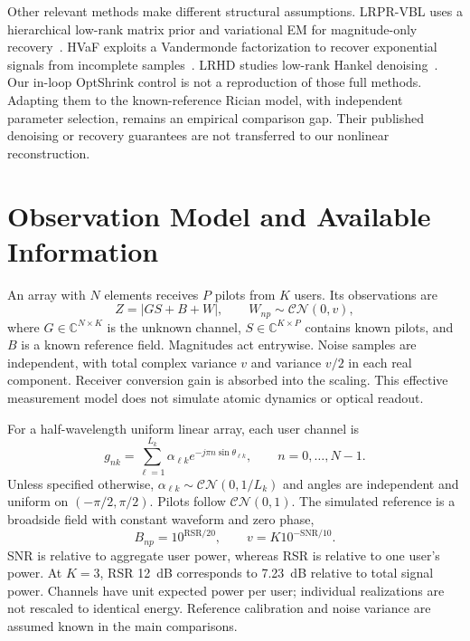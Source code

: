\documentclass[10pt,journal,letterpaper]{IEEEtran}
\newcommand{\CN}{\mathcal{CN}}
\begin{document}
Other relevant methods make different structural assumptions. LRPR-VBL uses a hierarchical low-rank matrix prior and variational EM for magnitude-only recovery~\cite{liu2018lrpr}. HVaF exploits a Vandermonde factorization to recover exponential signals from incomplete samples~\cite{ying2018hvaf}. LRHD studies low-rank Hankel denoising~\cite{yin2021}. Our in-loop OptShrink control is not a reproduction of those full methods. Adapting them to the known-reference Rician model, with independent parameter selection, remains an empirical comparison gap. Their published denoising or recovery guarantees are not transferred to our nonlinear reconstruction.

\section{Observation Model and Available Information}
\label{sec:model}
An array with $N$ elements receives $P$ pilots from $K$ users. Its observations are
\begin{equation}
 Z=|GS+B+W|,\qquad W_{np}\sim\CN(0,v),
 \label{eq:model}
\end{equation}
where $G\in\mathbb C^{N\times K}$ is the unknown channel, $S\in\mathbb C^{K\times P}$ contains known pilots, and $B$ is a known reference field. Magnitudes act entrywise. Noise samples are independent, with total complex variance $v$ and variance $v/2$ in each real component. Receiver conversion gain is absorbed into the scaling. This effective measurement model does not simulate atomic dynamics or optical readout.

For a half-wavelength uniform linear array, each user channel is
\begin{equation}
 g_{nk}=\sum_{\ell=1}^{L_k}\alpha_{\ell k}e^{-j\pi n\sin\theta_{\ell k}},
 \qquad n=0,\ldots,N-1.
 \label{eq:channel}
\end{equation}
Unless specified otherwise, $\alpha_{\ell k}\sim\CN(0,1/L_k)$ and angles are independent and uniform on $(-\pi/2,\pi/2)$. Pilots follow $\CN(0,1)$. The simulated reference is a broadside field with constant waveform and zero phase,
\begin{equation}
 B_{np}=10^{\mathrm{RSR}/20},\qquad v=K10^{-\mathrm{SNR}/10}.
\end{equation}
SNR is relative to aggregate user power, whereas RSR is relative to one user's power. At $K=3$, RSR 12~dB corresponds to 7.23~dB relative to total signal power. Channels have unit expected power per user; individual realizations are not rescaled to identical energy. Reference calibration and noise variance are assumed known in the main comparisons.
\end{document}
